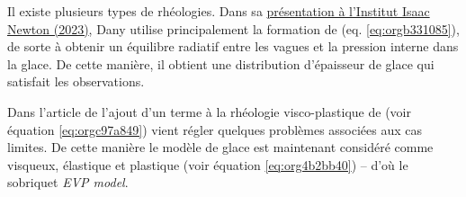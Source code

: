 \documentclass[10pt]{article}
\numberwithin{equation}{section}
\begin{document}
Il existe plusieurs types de rhéologies.
Dans sa \href{https://www.youtube.com/watch?v=\_V7ozTp6SJM}{présentation à l'Institut Isaac Newton (2023)}, Dany utilise principalement la formation de \Textcite{hibler1979dynamic} (eq. \ref{eq:orgb331085}), de sorte à obtenir un équilibre radiatif entre les vagues et la pression interne dans la glace.
De cette manière, il obtient une distribution d'épaisseur de glace qui satisfait les observations.\medskip

Dans l'article de \Textcite{hunke1997elastic}  l'ajout d'un terme à la rhéologie visco-plastique de \Textcite{hibler1979dynamic} (voir équation \ref{eq:orgc97a849}) vient régler quelques problèmes associées aux cas limites.
De cette manière le modèle de glace est maintenant considéré comme visqueux, élastique et plastique (voir équation \ref{eq:org4b2bb40}) -- d'où le sobriquet \emph{EVP model}.



\printbibliography
\end{document}

